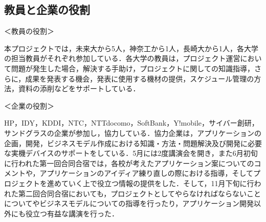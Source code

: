 \subsection{教員と企業の役割}
\par ＜教員の役割＞
\par 本プロジェクトでは，未来大から5人，神奈工から1人，長崎大から1人，各大学の担当教員がそれぞれ参加している．各大学の教員は，プロジェクト運営において問題が発生した場合，解決する手助け，プロジェクトに関しての知識指導，さらに，成果を発表する機会，発表に使用する機材の提供，スケジュール管理の方法，資料の添削などをサポートしている．

\par ＜企業の役割＞
\par
HP，IDY，KDDI，NTC，NTTdocomo，SoftBank，Y!mobile，サイバー創研，サンドグラスの企業が参加し，協力している．協力企業は，アプリケーションの企画，開発，ビジネスモデル作成における知識・方法・問題解決及び開発に必要な実機デバイスのサポートをしている．5月には2度講演会を開き，また6月初旬に行われた第一回合同合宿では，各校が考えたアプリケーション案についてのコメントや，アプリケーションのアイディア練り直しの際における指導，そしてプロジェクトを進めていく上で役立つ情報の提供をした．そして，11月下旬に行われた第二回合同合宿においても，プロジェクトとしてやらなければならないことについてやビジネスモデルについての指導を行ったり，アプリケーション開発以外にも役立つ有益な講演を行った．
